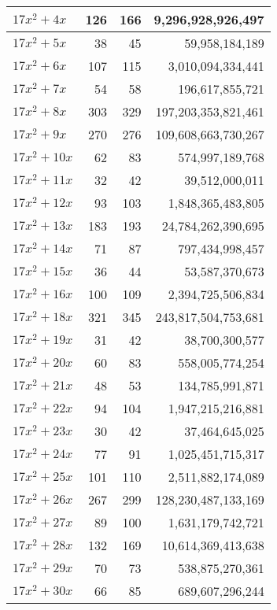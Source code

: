 \documentclass[a4paper]{amsproc}
\theoremstyle{plain}
\theoremstyle{named}
\begin{document}
\begin{longtable}{ | l | r | r | r | }
$17x^2 + 4x$ & 126 & 166 & 9{,}296{,}928{,}926{,}497 \\ \hline
$17x^2 + 5x$ & 38 & 45 & 59{,}958{,}184{,}189 \\ \hline
$17x^2 + 6x$ & 107 & 115 & 3{,}010{,}094{,}334{,}441 \\ \hline
$17x^2 + 7x$ & 54 & 58 & 196{,}617{,}855{,}721 \\ \hline
$17x^2 + 8x$ & 303 & 329 & 197{,}203{,}353{,}821{,}461 \\ \hline
$17x^2 + 9x$ & 270 & 276 & 109{,}608{,}663{,}730{,}267 \\ \hline
$17x^2 + 10x$ & 62 & 83 & 574{,}997{,}189{,}768 \\ \hline
$17x^2 + 11x$ & 32 & 42 & 39{,}512{,}000{,}011 \\ \hline
$17x^2 + 12x$ & 93 & 103 & 1{,}848{,}365{,}483{,}805 \\ \hline
$17x^2 + 13x$ & 183 & 193 & 24{,}784{,}262{,}390{,}695 \\ \hline
$17x^2 + 14x$ & 71 & 87 & 797{,}434{,}998{,}457 \\ \hline
$17x^2 + 15x$ & 36 & 44 & 53{,}587{,}370{,}673 \\ \hline
$17x^2 + 16x$ & 100 & 109 & 2{,}394{,}725{,}506{,}834 \\ \hline
$17x^2 + 18x$ & 321 & 345 & 243{,}817{,}504{,}753{,}681 \\ \hline
$17x^2 + 19x$ & 31 & 42 & 38{,}700{,}300{,}577 \\ \hline
$17x^2 + 20x$ & 60 & 83 & 558{,}005{,}774{,}254 \\ \hline
$17x^2 + 21x$ & 48 & 53 & 134{,}785{,}991{,}871 \\ \hline
$17x^2 + 22x$ & 94 & 104 & 1{,}947{,}215{,}216{,}881 \\ \hline
$17x^2 + 23x$ & 30 & 42 & 37{,}464{,}645{,}025 \\ \hline
$17x^2 + 24x$ & 77 & 91 & 1{,}025{,}451{,}715{,}317 \\ \hline
$17x^2 + 25x$ & 101 & 110 & 2{,}511{,}882{,}174{,}089 \\ \hline
$17x^2 + 26x$ & 267 & 299 & 128{,}230{,}487{,}133{,}169 \\ \hline
$17x^2 + 27x$ & 89 & 100 & 1{,}631{,}179{,}742{,}721 \\ \hline
$17x^2 + 28x$ & 132 & 169 & 10{,}614{,}369{,}413{,}638 \\ \hline
$17x^2 + 29x$ & 70 & 73 & 538{,}875{,}270{,}361 \\ \hline
$17x^2 + 30x$ & 66 & 85 & 689{,}607{,}296{,}244 \\ \hline

\end{longtable}
\end{document}
